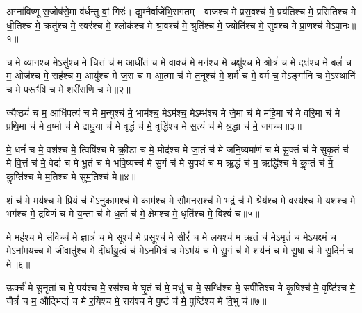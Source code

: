 
{\anuvakamend[{घा॒सिं कश॑या तपद्र॒यिं नव॑ च॥९॥}]}

\setcounter{anuvakam}{0}
अग्ना॑विष्णू स॒जोष॑से॒मा व॑र्धन्तु वां॒ गिरः॑। द्यु॒म्नैर्वाजे॑भि॒राग॑तम्। वाज॑श्च मे प्रस॒वश्च॑ मे॒ प्रय॑तिश्च मे॒ प्रसि॑तिश्च मे धी॒तिश्च॑ मे॒ क्रतु॑श्च मे॒ स्वर॑श्च मे॒ श्लोक॑श्च मे श्रा॒वश्च॑ मे॒ श्रुति॑श्च मे॒ ज्योति॑श्च मे॒ सुव॑श्च मे प्रा॒णश्च॑ मे\-ऽपा॒नः॥१॥

च॒ मे॒ व्या॒नश्च॒ मे\-ऽसु॑श्च मे चि॒त्तं च॑ म॒ आधी॑तं च मे॒ वाक्च॑ मे॒ मन॑श्च मे॒ चक्षु॑श्च मे॒ श्रोत्रं॑ च मे॒ दक्ष॑श्च मे॒ बलं॑ च म॒ ओज॑श्च मे॒ सह॑श्च म॒ आयु॑श्च मे ज॒रा च॑ म आ॒त्मा च॑ मे त॒नूश्च॑ मे॒ शर्म॑ च मे॒ वर्म॑ च॒ मे\-ऽङ्गा॑नि च मे॒\-ऽस्थानि॑ च मे॒ परूꣳ॑षि च मे॒ शरी॑राणि च मे॥२॥

{\anuvakamend[{अ॒पा॒नस्त॒नूश्च॑ मे॒\-ऽष्टाद॑श च॥१॥}]}

ज्यैष्ठ्यं॑ च म॒ आधि॑पत्यं च मे म॒न्युश्च॑ मे॒ भाम॑श्च॒ मे\-ऽम॑श्च॒ मे\-ऽम्भ॑श्च मे जे॒मा च॑ मे महि॒मा च॑ मे वरि॒मा च॑ मे प्रथि॒मा च॑ मे व॒र्ष्मा च॑ मे द्राघु॒या च॑ मे वृ॒द्धं च॑ मे॒ वृद्धि॑श्च मे स॒त्यं च॑ मे श्र॒द्धा च॑ मे॒ जग॑च्च॥३॥

मे॒ धनं॑ च मे॒ वश॑श्च मे॒ त्विषि॑श्च मे क्री॒डा च॑ मे॒ मोद॑श्च मे जा॒तं च॑ मे जनि॒ष्यमा॑णं च मे सू॒क्तं च॑ मे सुकृ॒तं च॑ मे वि॒त्तं च॑ मे॒ वेद्यं॑ च मे भू॒तं च॑ मे भवि॒ष्यच्च॑ मे सु॒गं च॑ मे सु॒पथं॑ च म ऋ॒द्धं च॑ म॒ ऋद्धि॑श्च मे कॢ॒प्तं च॑ मे॒ कॢप्ति॑श्च मे म॒तिश्च॑ मे सुम॒तिश्च॑ मे॥४॥

{\anuvakamend[{जग॒च्चर्द्धि॒श्चतु॑र्दश च॥२॥}]}

शं च॑ मे॒ मय॑श्च मे प्रि॒यं च॑ मे\-ऽनुका॒मश्च॑ मे॒ काम॑श्च मे सौमन॒सश्च॑ मे भ॒द्रं च॑ मे॒ श्रेय॑श्च मे॒ वस्य॑श्च मे॒ यश॑श्च मे॒ भग॑श्च मे॒ द्रवि॑णं च मे य॒न्ता च॑ मे ध॒र्ता च॑ मे॒ क्षेम॑श्च मे॒ धृति॑श्च मे॒ विश्वं॑ च॥५॥

मे॒ मह॑श्च मे सं॒विच्च॑ मे॒ ज्ञात्रं॑ च मे॒ सूश्च॑ मे प्र॒सूश्च॑ मे॒ सीरं॑ च मे ल॒यश्च॑ म ऋ॒तं च॑ मे॒\-ऽमृतं॑ च मे\-ऽय॒क्ष्मं च॒ मे\-ऽना॑मयच्च मे जी॒वातु॑श्च मे दीर्घायु॒त्वं च॑ मे\-ऽनमि॒त्रं च॒ मे\-ऽभ॑यं च मे सु॒गं च॑ मे॒ शय॑नं च मे सू॒षा च॑ मे सु॒दिनं॑ च मे॥६॥

{\anuvakamend[{विश्वं॑ च॒ शय॑नम॒ष्टौ च॑॥३॥}]}

ऊर्क्च॑ मे सू॒नृता॑ च मे॒ पय॑श्च मे॒ रस॑श्च मे घृ॒तं च॑ मे॒ मधु॑ च मे॒ सग्धि॑श्च मे॒ सपी॑तिश्च मे कृ॒षिश्च॑ मे॒ वृष्टि॑श्च मे॒ जैत्रं॑ च म॒ औद्भि॑द्यं च मे र॒यिश्च॑ मे॒ राय॑श्च मे पु॒ष्टं च॑ मे॒ पुष्टि॑श्च मे वि॒भु च॑॥७॥

